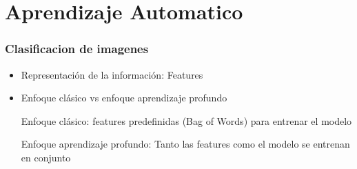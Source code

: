 \documentclass[12pt,center]{beamer}
\newcommand{\subitem}{\par\qquad}
\begin{document}
\section{Aprendizaje Automatico}

\begin{frame}
  \frametitle{Clasificacion de imagenes}
  \begin{itemize}
    \item Representación de la información: Features
    \item Enfoque clásico vs enfoque aprendizaje profundo
      \subitem Enfoque clásico: features predefinidas (Bag of Words) para entrenar el modelo
      \subitem Enfoque aprendizaje profundo: Tanto las features como el modelo se entrenan en conjunto 
  \end{itemize}
\end{frame}
\end{document}
